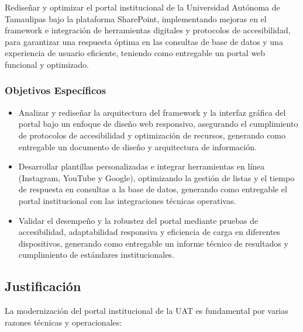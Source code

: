 Rediseñar y optimizar el portal institucional de la Universidad Autónoma de Tamaulipas bajo la plataforma SharePoint, implementando mejoras en el framework e integración de herramientas digitales y protocolos de accesibilidad, para garantizar una respuesta óptima en las consultas de base de datos y una experiencia de usuario eficiente, teniendo como entregable un portal web funcional y optimizado.

\subsubsection{Objetivos Específicos}
\label{subsec:objetivos_especificos}

\begin{itemize}
    \item \textbf{} Analizar y rediseñar la arquitectura del framework y la interfaz gráfica del portal bajo un enfoque de diseño web responsivo, asegurando el cumplimiento de protocolos de accesibilidad y optimización de recursos, generando como entregable un documento de diseño y arquitectura de información.
    \item \textbf{} Desarrollar plantillas personalizadas e integrar herramientas en línea (Instagram, YouTube y Google), optimizando la gestión de listas y el tiempo de respuesta en consultas a la base de datos, generando como entregable el portal institucional con las integraciones técnicas operativas.
    \item \textbf{} Validar el desempeño y la robustez del portal mediante pruebas de accesibilidad, adaptabilidad responsiva y eficiencia de carga en diferentes dispositivos, generando como entregable un informe técnico de resultados y cumplimiento de estándares institucionales.
\end{itemize}

\subsection{Justificación}
\label{sec:justificacion}

La modernización del portal institucional de la UAT es fundamental por varias razones técnicas y operacionales:

